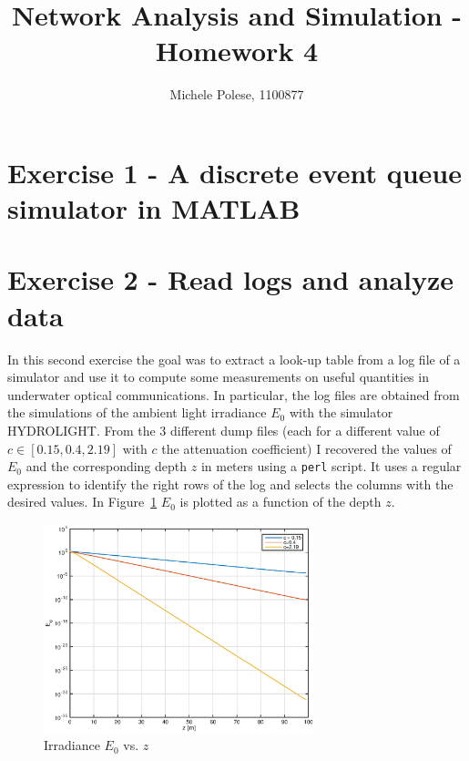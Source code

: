 \documentclass[10pt]{article}
\begin{document}
\title{Network Analysis and Simulation - Homework 4}
\author{Michele Polese, 1100877}

\maketitle

\section*{Exercise 1 - A discrete event queue simulator in MATLAB}


\section*{Exercise 2 - Read logs and analyze data}
In this second exercise the goal was to extract a look-up table from a log file of a simulator and use it to compute some measurements on useful quantities in underwater optical communications. In particular, the log files are obtained from the simulations of the ambient light irradiance $E_0$ with the simulator HYDROLIGHT. From the 3 different dump files (each for a different value of $c \in [0.15, 0.4, 2.19]$ with $c$ the attenuation coefficient) I recovered the values of $E_0$ and the corresponding depth $z$ in meters using a \texttt{perl} script. It uses a regular expression to identify the right rows of the log and selects the columns with the desired values. In Figure~\ref{fig:e0zm} $E_0$ is plotted as a function of the depth $z$.

\begin{figure}[h!]
	\centering
	\includegraphics[width = 0.7\textwidth]{e0_z}
	\caption{Irradiance $E_0$ vs. $z$}
	\label{fig:e0zm}
\end{figure}
\end{document}
